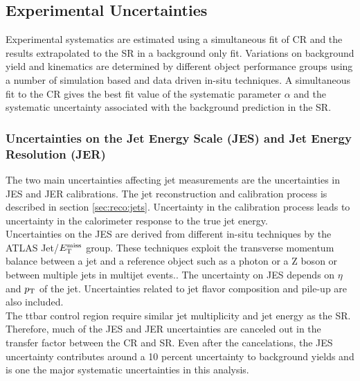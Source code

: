 \subsection{Experimental Uncertainties}
\label{sec:ExpSystematics}

\indent Experimental systematics are estimated using a simultaneous fit of CR and the results extrapolated to the SR in a background only fit.  Variations on background yield and kinematics are determined by different object performance groups using a number of simulation based and data driven in-situ techniques.  A simultaneous fit to the CR gives the best fit value of the systematic parameter $\alpha$ and the systematic uncertainty associated with the background prediction in the SR. \\

\subsubsection*{Uncertainties on the Jet Energy Scale (JES) and Jet Energy Resolution (JER) } 

\indent The two main uncertainties affecting jet measurements are the uncertainties in JES and JER calibrations. The jet reconstruction and calibration process is described in section \ref{sec:reco:jets}.  Uncertainty in the calibration process leads to uncertainty in the calorimeter response to the true jet energy. \\

\indent Uncertainties on the JES are derived from different in-situ techniques by the ATLAS Jet/$E_{\mathrm{T}}^{\mathrm{miss}}$ group.  These techniques exploit the transverse momentum balance between a jet and a reference object such as a photon or a Z boson or between multiple jets in multijet events.\cite{JES_dijet, JES_ZGamma}.  The uncertainty on JES depends on $\eta$ and $p_{\mathrm{T}}$ of the jet.  Uncertainties related to jet flavor composition and pile-up are also included.  \\

\indent  The ttbar control region require similar jet multiplicity and jet energy as the SR.  Therefore, much of the JES and JER uncertainties are canceled out in the transfer factor between the CR and SR.  Even after the cancelations, the JES uncertainty contributes around a 10 percent uncertainty to background yields and is one the major systematic uncertainties in this analysis.  \\



